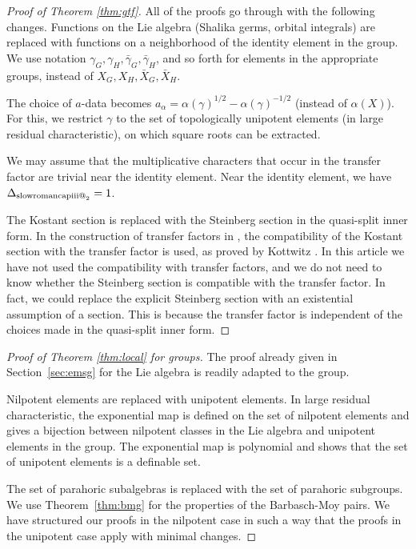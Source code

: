 \documentclass[12pt]{amsart}
\makeatletter
\newcommand*{\rom}[1]{\text{\expandafter\@slowromancap\romannumeral #1@}}
\theoremstyle{plain}
\theoremstyle{definition}
\makeatother
\begin{document}
\begin{proof}[Proof of Theorem \ref{thm:gtf}]
  All of the proofs go through with the following changes.  Functions
  on the Lie algebra (Shalika germs, orbital integrals) are replaced
  with functions on a neighborhood of the identity element in the
  group.  We use notation $\gamma_G,\gamma_H,\bar \gamma_G,\bar
  \gamma_H$, and so forth for elements in the appropriate groups,
  instead of $X_G,X_H,\bar X_G,\bar X_H$.

The choice of $a$-data becomes $a_\alpha = \alpha(\gamma)^{1/2} -
\alpha(\gamma)^{-1/2}$ (instead of $\alpha(X)$).  For this, we
restrict $\gamma$ to the set of topologically unipotent elements (in large
residual characteristic), on which square roots can be extracted.

We may assume that the multiplicative characters that occur in the
transfer factor are trivial near the identity element. Near the
identity element, we have $\Delta_{\rom{3}_2}=1$.

The Kostant section is replaced with the Steinberg section in the
quasi-split inner form.  In the construction of transfer factors in
\cite{CHL}, the compatibility of the Kostant section with the transfer
factor is used, as proved by Kottwitz \cite{Kott}.  In this article we
have not used the compatibility with transfer factors, and we do not
need to know whether the Steinberg section is compatible with the
transfer factor.  In fact, we could replace the explicit Steinberg
section with an existential assumption of a section.  This is because
the transfer factor is independent of the choices made in the
quasi-split inner form.
\end{proof}

\begin{proof}[Proof of Theorem \ref{thm:local} for groups] 
  The proof already given in Section~\ref{sec:emsg} for the Lie
  algebra is readily adapted to the group.

  Nilpotent elements are replaced with unipotent elements.  In large
  residual characteristic, the exponential map is defined on the set
  of nilpotent elements and gives a bijection between nilpotent
  classes in the Lie algebra and unipotent elements in the group.  The
  exponential map is polynomial and shows that the set of unipotent
  elements is a definable set.

  The set of parahoric subalgebras is replaced with the set of parahoric
  subgroups.  We use Theorem~\ref{thm:bmg} for the properties of the
  Barbasch-Moy pairs.  We have structured our proofs in the nilpotent
  case in such a way that the proofs in the unipotent case apply
  with minimal changes.
\end{proof}
\end{document}

